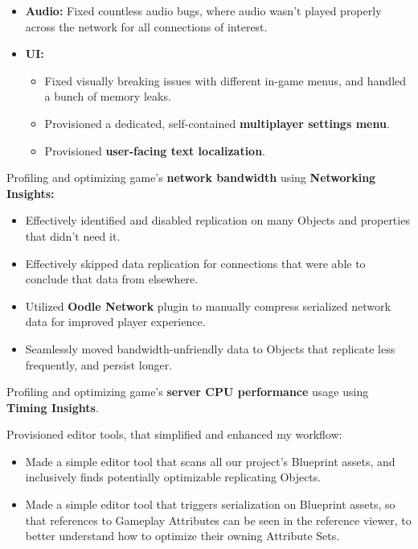 \begin{cventries}
{\begin{cvitems}
{\begin{itemize}
            \item {\textbf{Audio:} Fixed countless audio bugs, where audio wasn't played properly across the network for all connections of interest.}
            \item {\textbf{UI:}
              \begin{itemize}
                \item {Fixed visually breaking issues with different in-game menus, and handled a bunch of memory leaks.}
                \item {Provisioned a dedicated, self-contained \textbf{multiplayer settings menu}.}
                \item {Provisioned \textbf{user-facing text localization}.}
              \end{itemize}
            }
          \end{itemize}
        }
        \item {Profiling and optimizing game's \textbf{network bandwidth} using \textbf{Networking Insights:}
        \begin{itemize}
          \item {Effectively identified and disabled replication on many Objects and properties that didn't need it.}
          \item {Effectively skipped data replication for connections that were able to conclude that data from elsewhere.}
          \item {Utilized \textbf{Oodle Network} plugin to manually compress serialized network data for improved player experience.}
          \item {Seamlessly moved bandwidth-unfriendly data to Objects that replicate less frequently, and persist longer.}
        \end{itemize}
        }
        \item {Profiling and optimizing game's \textbf{server CPU performance} usage using \textbf{Timing Insights}.}
        \item {Provisioned editor tools, that simplified and enhanced my workflow:
        \begin{itemize}
          \item {Made a simple editor tool that scans all our project's Blueprint assets, and inclusively finds potentially optimizable replicating Objects.}
          \item {Made a simple editor tool that triggers serialization on Blueprint assets, so that references to Gameplay Attributes can be seen in the reference viewer, to better understand how to optimize their owning Attribute Sets.}
        \end{itemize}
        }
      \end{cvitems}
    }


\end{cventries}
